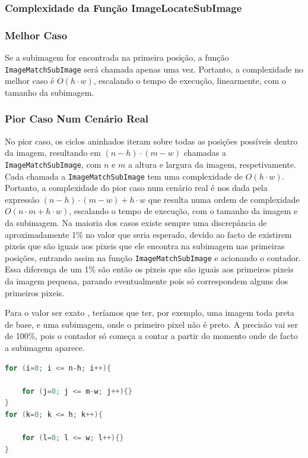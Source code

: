 \documentclass{report}
\begin{document}
\subsubsection{Complexidade da Função ImageLocateSubImage}

\subsubsection{Melhor Caso}
Se a subimagem for encontrada na primeira posição, a função \texttt{ImageMatchSubImage} será chamada apenas uma vez. 
Portanto, a complexidade no melhor caso é \(O(h \cdot w)\), escalando o tempo de execução, linearmente, com o tamanho da subimagem.

\subsubsection{Pior Caso Num Cenário Real}
No pior caso, os ciclos aninhados iteram sobre todas as posições possíveis dentro da imagem, 
resultando em \((n-h) \cdot (m-w)\) chamadas a \texttt{ImageMatchSubImage}, com \(n\) e \(m\) a altura e largura da imagem, respetivamente. 
Cada chamada a \texttt{ImageMatchSubImage} tem uma complexidade de \(O(h \cdot w)\).
Portanto, a complexidade do pior caso num cenário real é nos dada pela expressão \((n-h) \cdot (m-w) + h \cdot w\) que resulta numa ordem de complexidade \(O(n \cdot m + h \cdot w)\), escalando o tempo de execução, 
com o tamanho da imagem e da subimagem. Na maioria dos casos existe sempre uma discrepância de aproximadamente 1\% no valor que seria esperado, devido ao facto de existirem pixeis que são iguais aos pixeis que ele encontra na subimagem nas primeiras posições, entrando assim na função \texttt{ImageMatchSubImage} e acionando o contador. Essa diferença de um 1\% são então os pixeis que são iguais aos primeiros pixeis da imagem pequena, parando eventualmente pois só correspondem alguns dos primeiros pixeis.

Para o valor ser exato , teríamos que ter, por exemplo, uma imagem toda preta de base, e uma subimagem, onde o primeiro pixel não é preto. A precisão vai ser de 100\%, pois o contador só começa a contar a partir do momento onde de facto a subimagem aparece.

\vspace{5mm}

\begingroup
\begin{lstlisting}[language=C]
for (i=0; i <= n-h; i++){
    
    for (j=0; j <= m-w; j++){}
}            
for (k=0; k <= h; k++){
            
    for (l=0; l <= w; l++){}
}
\end{lstlisting}
\endgroup
\end{document}
